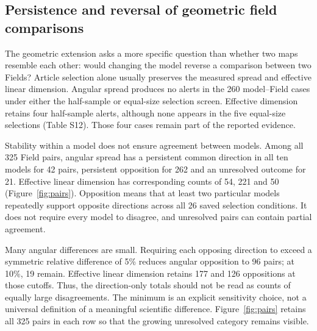\documentclass[12pt]{article}
\begin{document}
\subsection{Persistence and reversal of geometric field comparisons}
The geometric extension asks a more specific question than whether two maps resemble each other: would changing the model reverse a comparison between two Fields? Article selection alone usually preserves the measured spread and effective linear dimension. Angular spread produces no alerts in the 260 model--Field cases under either the half-sample or equal-size selection screen. Effective dimension retains four half-sample alerts, although none appears in the five equal-size selections (Table S12). Those four cases remain part of the reported evidence.

Stability within a model does not ensure agreement between models. Among all 325 Field pairs, angular spread has a persistent common direction in all ten models for 42 pairs, persistent opposition for 262 and an unresolved outcome for 21. Effective linear dimension has corresponding counts of 54, 221 and 50 (Figure~\ref{fig:pairs}). Opposition means that at least two particular models repeatedly support opposite directions across all 26 saved selection conditions. It does not require every model to disagree, and unresolved pairs can contain partial agreement.

Many angular differences are small. Requiring each opposing direction to exceed a symmetric relative difference of 5\% reduces angular opposition to 96 pairs; at 10\%, 19 remain. Effective linear dimension retains 177 and 126 oppositions at those cutoffs. Thus, the direction-only totals should not be read as counts of equally large disagreements. The minimum is an explicit sensitivity choice, not a universal definition of a meaningful scientific difference. Figure~\ref{fig:pairs} retains all 325 pairs in each row so that the growing unresolved category remains visible.

\end{document}

